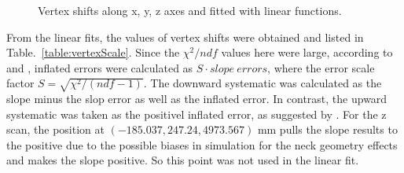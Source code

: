 \begin{figure}
	\centering
	\caption{Vertex shifts along x, y, z axes and fitted with linear functions.}
	\label{fig:vertexScale}
\end{figure}

From the linear fits, the values of vertex shifts were obtained and listed in Table.~\ref{table:vertexScale}. Since the $\chi^2/ndf$ values here were large, according to \cite{waterunidoc} and \cite{pdg2020}, inflated errors were calculated as $S\cdot slope~errors$, where the error scale factor $S=\sqrt{\chi^2/(ndf-1)}$. The downward systematic was calculated as the slope minus the slop error as well as the inflated error. In contrast, the upward systematic was taken as the positivel inflated error, as suggested by \cite{waterunidoc}. For the z scan, the position at $(-185.037,247.24,4973.567)$ mm pulls the slope results to the positive due to the possible biases in simulation for the neck geometry effects and makes the slope positive. So this point was not used in the linear fit.

